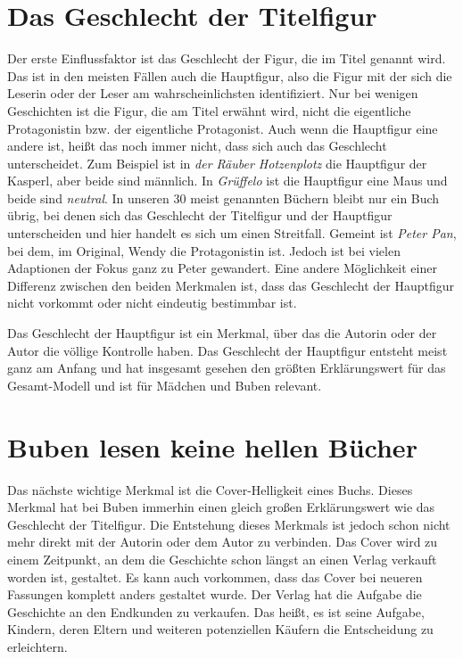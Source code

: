 \section{Das Geschlecht der Titelfigur}

Der erste Einflussfaktor ist das Geschlecht der Figur, die im Titel
genannt wird. Das ist in den meisten Fällen auch die Hauptfigur, also
die Figur mit der sich die Leserin oder der Leser am wahrscheinlichsten
identifiziert. Nur bei wenigen Geschichten ist die Figur, die am Titel
erwähnt wird, nicht die eigentliche Protagonistin bzw. der eigentliche
Protagonist. Auch wenn die Hauptfigur eine andere ist, heißt das noch
immer nicht, dass sich auch das Geschlecht unterscheidet. Zum Beispiel
ist in \emph{der Räuber Hotzenplotz} die Hauptfigur der Kasperl, aber
beide sind männlich. In \emph{Grüffelo} ist die Hauptfigur eine Maus und
beide sind \emph{neutral}. In unseren 30 meist genannten Büchern bleibt
nur ein Buch übrig, bei denen sich das Geschlecht der Titelfigur und der
Hauptfigur unterscheiden und hier handelt es sich um einen Streitfall.
Gemeint ist \emph{Peter Pan}, bei dem, im Original, Wendy die
Protagonistin ist. Jedoch ist bei vielen Adaptionen der Fokus ganz zu
Peter gewandert. Eine andere Möglichkeit einer Differenz zwischen den
beiden Merkmalen ist, dass das Geschlecht der Hauptfigur nicht vorkommt
oder nicht eindeutig bestimmbar ist.

Das Geschlecht der Hauptfigur ist ein Merkmal, über das die Autorin oder
der Autor die völlige Kontrolle haben. Das Geschlecht der Hauptfigur
entsteht meist ganz am Anfang und hat insgesamt gesehen den größten
Erklärungswert für das Gesamt-Modell und ist für Mädchen und Buben
relevant.

\section{Buben lesen keine hellen Bücher}

Das nächste wichtige Merkmal ist die Cover-Helligkeit eines Buchs.
Dieses Merkmal hat bei Buben immerhin einen gleich großen Erklärungswert
wie das Geschlecht der Titelfigur. Die Entstehung dieses Merkmals ist
jedoch schon nicht mehr direkt mit der Autorin oder dem Autor zu
verbinden. Das Cover wird zu einem Zeitpunkt, an dem die Geschichte
schon längst an einen Verlag verkauft worden ist, gestaltet. Es kann
auch vorkommen, dass das Cover bei neueren Fassungen komplett anders
gestaltet wurde. Der Verlag hat die Aufgabe die Geschichte an den
Endkunden zu verkaufen. Das heißt, es ist seine Aufgabe, Kindern, deren
Eltern und weiteren potenziellen Käufern die Entscheidung zu
erleichtern.

